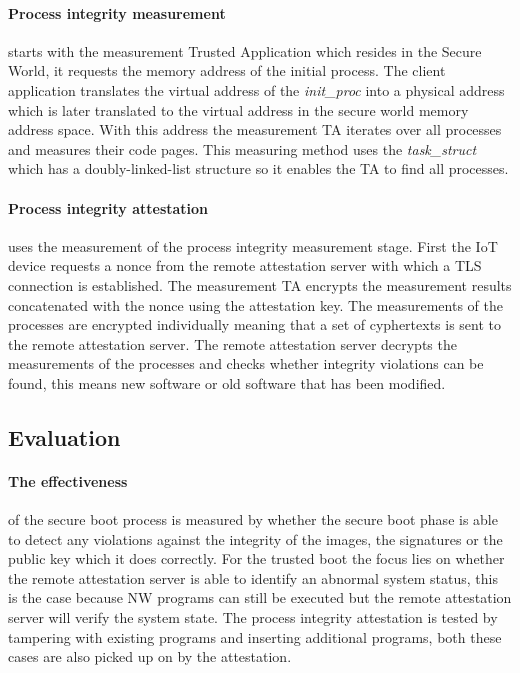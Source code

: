 \paragraph*{Process integrity measurement}
starts with the measurement Trusted Application which resides in the Secure World, it requests the memory address of the initial process. The client application translates the virtual address of the \textit{init\_proc} into a physical address which is later translated to the virtual address in the secure world memory address space. With this address the measurement TA iterates over all processes and measures their code pages. This measuring method uses the \textit{task\_struct} which has a doubly-linked-list structure so it enables the TA to find all processes. 

\paragraph*{Process integrity attestation}
uses the measurement of the process integrity measurement stage. First the IoT device requests a nonce from the remote attestation server with which a TLS connection is established. The measurement TA encrypts the measurement results concatenated with the nonce using the attestation key. The measurements of the processes are encrypted individually meaning that a set of cyphertexts is sent to the remote attestation server. The remote attestation server decrypts the measurements of the processes and checks whether integrity violations can be found, this means new software or old software that has been modified.

\subsection*{Evaluation} 

\paragraph*{The effectiveness}
of the secure boot process is measured by whether the secure boot phase is able to detect any violations against the integrity of the images, the signatures or the public key which it does correctly. For the trusted boot the focus lies on whether the remote attestation server is able to identify an abnormal system status, this is the case because NW programs can still be executed but the remote attestation server will verify the system state. The process integrity attestation is tested by tampering with existing programs and inserting additional programs, both these cases are also picked up on by the attestation. 

